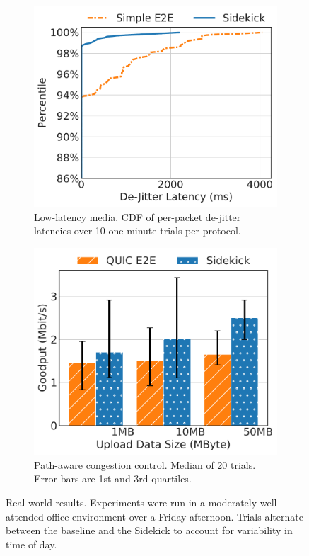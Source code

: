 \begin{figure}[t]
\centering
\begin{subfigure}{0.48\linewidth}
	\includegraphics[width=\linewidth]{sidekick/figures/fig8_real_world_webrtc.pdf}
	\caption{Low-latency media. CDF of per-packet de-jitter
	latencies over 10 one-minute trials per protocol.}
	\label{fig:sidekick:real-world:media}
\end{subfigure}
\begin{subfigure}{0.48\linewidth}
	\includegraphics[width=\linewidth]{sidekick/figures/fig8_real_world_retx.pdf}
	\caption{Path-aware congestion control.
	Median of 20 trials. Error bars are 1st and 3rd quartiles.}
	\label{fig:sidekick:real-world:pep-emulation}
\end{subfigure}
\caption{Real-world results. Experiments were run in a moderately well-attended
office environment over a Friday afternoon. Trials alternate between the
baseline and the Sidekick to account for variability in time of day.
}
\label{fig:sidekick:real-world}
\end{figure}
